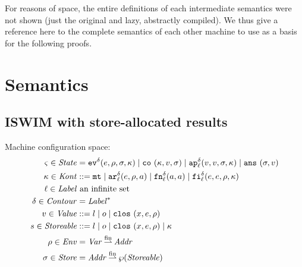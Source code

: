 \documentclass{llncs}
\newcommand{\finto}{\mathbin{\overset{\text{fin}}{\rightharpoonup}}}
\newcommand{\Var}{\mathit{Var}}
\newcommand{\alt}{\mid}
\begin{document}
For reasons of space, the entire definitions of each intermediate
semantics were not shown (just the original and lazy, abstractly
compiled). We thus give a reference here to the complete semantics of
each other machine to use as a basis for the following proofs.

\section{Semantics}

\subsection{ISWIM with store-allocated results}

Machine configuration space:
\begin{align*}
\mstate \in \State &= \ev[^\mcntr]{\mexp, \menv, \msto, \mkont} \alt
                     \co{\mkont, \mval, \msto} \alt
                     \ap[_\mlab^\mcntr]{\mval,\mval,\msto,\mkont} \alt
                     \ans{\msto,\mval} \\
\mkont \in \Kont &::= \kmt \alt
                      \kar[_\mlab^\mcntr]{\mexp, \menv, \maddr} \alt
                      \kfn[_\mlab^\mcntr]{\maddr, \maddr} \alt
                      \kif[_\mlab^\mcntr]{\mexp, \mexp, \menv, \mkont} \\
\mlab \in \Label &\text{ an infinite set} \\
\mcntr \in \Counter &= \Label^* \\
\mval \in \Value &::= \mlit \alt \mop \alt
                      \clos{\mvar,\mexp,\menv} \\
\mstor \in \Storeable &::= \mlit \alt \mop \alt
                           \clos{\mvar,\mexp,\menv} \alt
                           \mkont \\
\menv \in \Env &= \Var \finto \Addr \\
\msto \in \Store &= \Addr \finto \wp(\Storeable)
\end{align*}
\end{document}
